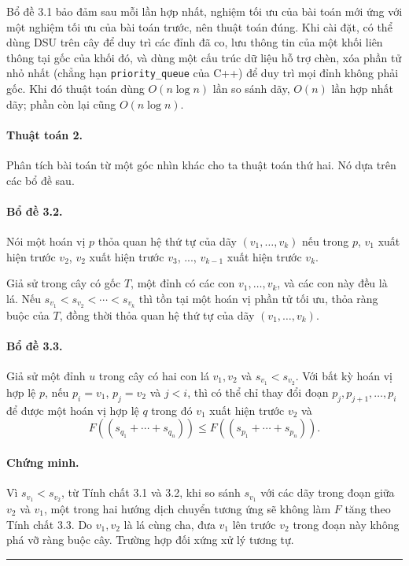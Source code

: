 \documentclass[11pt]{article}
\begin{document}
Bổ đề 3.1 bảo đảm sau mỗi lần hợp nhất, nghiệm tối ưu của bài toán mới ứng với
một nghiệm tối ưu của bài toán trước, nên thuật toán đúng. Khi cài đặt, có thể
dùng DSU trên cây để duy trì các đỉnh đã co, lưu thông tin của một khối liên
thông tại gốc của khối đó, và dùng một cấu trúc dữ liệu hỗ trợ chèn, xóa phần
tử nhỏ nhất (chẳng hạn \texttt{priority\_queue} của C++) để duy trì mọi đỉnh
không phải gốc. Khi đó thuật toán dùng $O(n\log n)$ lần so sánh dãy, $O(n)$ lần
hợp nhất dãy; phần còn lại cũng $O(n\log n)$.

\paragraph{Thuật toán 2.}
Phân tích bài toán từ một góc nhìn khác cho ta thuật toán thứ hai. Nó dựa trên
các bổ đề sau.

\paragraph{Bổ đề 3.2.}
Nói một hoán vị $p$ thỏa quan hệ thứ tự của dãy $(v_1,\ldots,v_k)$ nếu trong
$p$, $v_1$ xuất hiện trước $v_2$, $v_2$ xuất hiện trước $v_3$, ..., $v_{k-1}$
xuất hiện trước $v_k$.

Giả sử trong cây có gốc $T$, một đỉnh có các con $v_1,\ldots,v_k$, và các con
này đều là lá. Nếu $s_{v_1}<s_{v_2}<\cdots<s_{v_k}$ thì tồn tại một hoán vị
phần tử tối ưu, thỏa ràng buộc của $T$, đồng thời thỏa quan hệ thứ tự của dãy
$(v_1,\ldots,v_k)$.

\paragraph{Bổ đề 3.3.}
Giả sử một đỉnh $u$ trong cây có hai con lá $v_1,v_2$ và $s_{v_1}<s_{v_2}$. Với
bất kỳ hoán vị hợp lệ $p$, nếu $p_i=v_1$, $p_j=v_2$ và $j<i$, thì có thể chỉ
thay đổi đoạn $p_j,p_{j+1},\ldots,p_i$ để được một hoán vị hợp lệ $q$ trong đó
$v_1$ xuất hiện trước $v_2$ và
\[
  F((s_{q_1}+\cdots+s_{q_n}))
  \le
  F((s_{p_1}+\cdots+s_{p_n})).
\]

\paragraph{Chứng minh.}
Vì $s_{v_1}<s_{v_2}$, từ Tính chất 3.1 và 3.2, khi so sánh $s_{v_1}$ với các
dãy trong đoạn giữa $v_2$ và $v_1$, một trong hai hướng dịch chuyển tương ứng
sẽ không làm $F$ tăng theo Tính chất 3.3. Do $v_1,v_2$ là lá cùng cha, đưa
$v_1$ lên trước $v_2$ trong đoạn này không phá vỡ ràng buộc cây. Trường hợp đối
xứng xử lý tương tự. \hfill\rule{0.55em}{0.55em}
\end{document}
